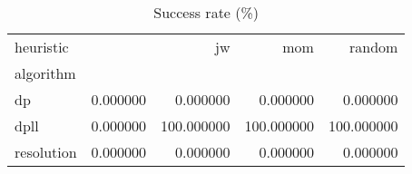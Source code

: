 \begin{table}
\caption{Success rate (\%)}
\label{tab:success-rate}
\begin{tabular}{lrrrr}
\toprule
heuristic &  & jw & mom & random \\
algorithm &  &  &  &  \\
\midrule
dp & 0.000000 & 0.000000 & 0.000000 & 0.000000 \\
dpll & 0.000000 & 100.000000 & 100.000000 & 100.000000 \\
resolution & 0.000000 & 0.000000 & 0.000000 & 0.000000 \\
\bottomrule
\end{tabular}
\end{table}
